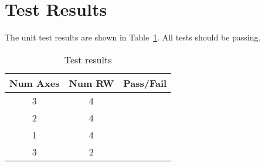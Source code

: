 \section{Test Results}
The unit test results are shown in Table~\ref{tab:results}.  All tests should be passing.
\begin{table}[H]
	\caption{Test results}
	\label{tab:results}
	\centering \fontsize{10}{10}\selectfont
	\begin{tabular}{c | c | c  } %
		\hline\hline
		\textbf{Num Axes} 		& \textbf{Num RW}				  		&\textbf{Pass/Fail} \\ 
		\hline
	   3	   			& 4 & \\ 
	   2	   			& 4 & \\ 
	   1	   			& 4 & \\ 
	   3	   			& 2 & \\ 
	   
	   
	   \hline\hline
	\end{tabular}
\end{table}








